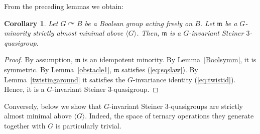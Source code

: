\documentclass{article}
\newtheorem{corollary}[theorem]{Corollary}
\theoremstyle{remark}
\theoremstyle{definition}
\def\acts{\curvearrowright}
\begin{document}
From the preceding lemmas we obtain:

\begin{corollary}\label{semimistein} Let $G\acts B$ be a Boolean group acting freely on $B$. Let $\mathfrak{m}$ be a $G$-minority strictly almost minimal above $\langle G\rangle$. Then, $\mathfrak{m}$ is a $G$-invariant Steiner $3$-quasigroup.
\end{corollary}
\begin{proof}
    By assumption, $\mathfrak{m}$ is an idempotent minority. By Lemma~\ref{Boolsymm}, it is symmetric. By Lemma~\ref{obstacle1}, $\mathfrak{m}$ satisfies (\ref{eq:sqslaw}). By Lemma~\ref{twistingaround} it satisfies the $G$-invariance identity (\ref{eq:twistid}). Hence, it is a $G$-invariant Steiner $3$-quasigroup.
\end{proof}

Conversely, below we show that $G$-invariant Steiner $3$-quasigroups are strictly almost minimal above $\langle G\rangle$. Indeed, the space of ternary operations they generate together with $G$ is particularly trivial.
\end{document}
